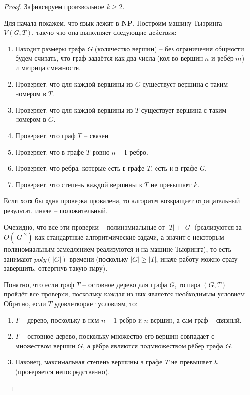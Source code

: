 \documentclass[a4paper,11pt]{article}
\renewcommand{\ge}{\ensuremath{\geqslant}}
\theoremstyle{plain}
\theoremstyle{definition}
\theoremstyle{remark}
\begin{document}
\begin{proof}

Зафиксируем произвольное $k \ge 2$.

Для начала покажем, что язык лежит в $\mathbf{NP}$. Построим машину Тьюринга $V(G, T)$, такую что она выполняет следующие действия:

\begin{enumerate}
  \item Находит размеры графа $G$ (количество вершин) -- без ограничения общности будем считать, что граф задаётся как два числа (кол-во вершин $n$ и ребёр $m$) и матрица смежности.
  \item Проверяет, что для каждой вершины из $G$ существует вершина с таким номером в $T$.
  \item Проверяет, что для каждой вершины из $T$ существует вершина с таким номером в $G$.
  \item Проверяет, что граф $T$ -- связен.
  \item Проверяет, что в графе $T$ ровно $n-1$ ребро.
  \item Проверяет, что ребра, которые есть в графе $T$, есть и в графе $G$.
  \item Проверяет, что степень каждой вершины в $T$ не превышает $k$.
\end{enumerate}

Если хотя бы одна проверка провалена, то алгоритм возвращает отрицательный результат, иначе -- положительный.

Очевидно, что все эти проверки -- полиномиальные от $|T| + |G|$ (реализуются за $O(|G|^2)$ как стандартные алгоритмические задачи, а значит с некоторым полиномиальным замедлением реализуются и на машине Тьюринга), то есть занимают $poly(|G|)$ времени (поскольку $|G| \ge |T|$, иначе работу можно сразу завершить, отвергнув такую пару).

Понятно, что если граф $T$ -- остовное дерево для графа $G$, то пара $(G, T)$ пройдёт все проверки, поскольку каждая из них является необходимым условием. Обратно, если $T$ удовлетворяет условиям, то:

\begin{enumerate}
  \item $T$ -- дерево, поскольку в нём $n-1$ ребро и $n$ вершин, а сам граф -- связный.
  \item $T$ -- остовное дерево, поскольку множество его вершин совпадает с множеством вершин $G$, а рёбра являются подмножеством рёбер графа $G$.
  \item Наконец, максимальная степень вершины в графе $T$ не превышает $k$ (проверяется непосредственно).
\end{enumerate}


\end{proof}
\end{document}
